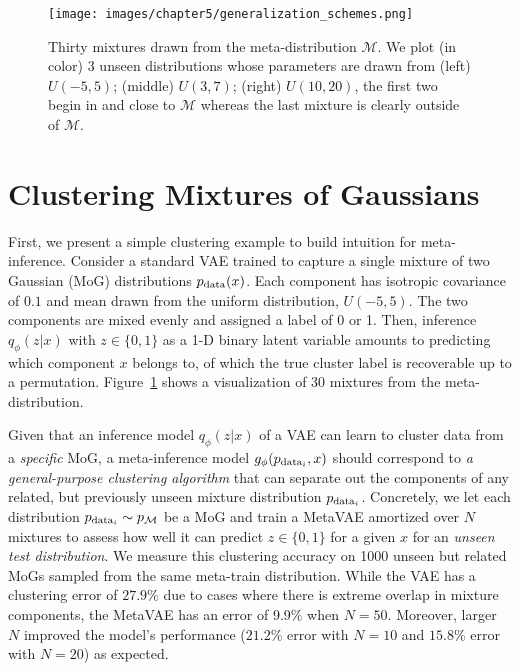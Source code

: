 \begin{figure}
\texttt{[image: images/chapter5/generalization\_schemes.png]}
\caption{Thirty mixtures drawn from the meta-distribution $\mathcal{M}$. We plot (in color) 3 unseen distributions whose parameters are drawn from (left) $U(-5, 5)$; (middle) $U(3,7)$; (right) $U(10, 20)$, the first two begin in and close to $\mathcal{M}$ whereas the last mixture is clearly outside of $\mathcal{M}$.}
\label{fig:mnist:gen}
\end{figure}

\section{Clustering Mixtures of Gaussians}
First, we present a simple clustering example to build intuition for meta-inference. Consider a standard VAE trained to capture a single mixture of two Gaussian (MoG) distributions $p_{\textup{data}}(x)$. Each component has isotropic covariance of $0.1$ and mean drawn from the uniform distribution, $U(-5, 5)$. The two components are mixed evenly and assigned a label of 0 or 1.
Then, inference $q_\phi(z|x)$ with  $z \in \{0, 1\}$ as a 1-D binary latent variable amounts to predicting which component $x$ belongs to, of which the true cluster label is recoverable up to a permutation.
Figure~\ref{fig:mnist:gen} shows a visualization of 30 mixtures from the meta-distribution. 

Given that an inference model $q_\phi(z|x)$ of a VAE can learn to cluster data from a \emph{specific} MoG, a meta-inference model $g_\phi(p_{\textup{data}_i},x)$ should correspond to \textit{a general-purpose clustering algorithm} that can separate out the components of any related, but previously  unseen mixture distribution $p_{\textup{data}_i}$. 
Concretely, we let each distribution $p_{\textup{data}_i} \sim p_\mathcal{M}$ be a MoG
and train a MetaVAE amortized over $N$ mixtures
to assess how well it can predict $z \in \{0,1\}$ for a given $x$ for an \emph{unseen test distribution}. 
We measure this clustering accuracy on 1000 unseen but related MoGs 
sampled from the same meta-train distribution.
While the VAE has a clustering error of $27.9$\% due to cases where there is extreme overlap in mixture components,
the MetaVAE has an error of 9.9\% when $N = 50$. 
Moreover, larger $N$ improved the model's performance ($21.2$\% error with $N=10$ and $15.8$\% error with $N=20$) as expected. 

